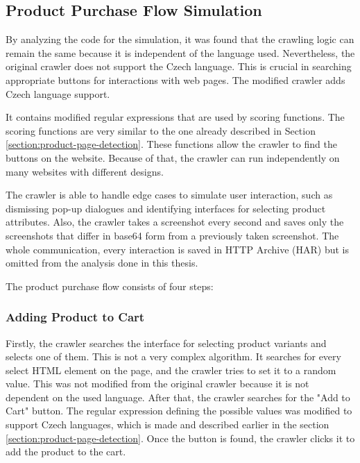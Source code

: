         \subsection{Product Purchase Flow Simulation}
        \label{section:flow-simulation}
            By analyzing the code for the simulation, it was found that the crawling logic can remain the same because it is independent of the language used. Nevertheless, the original crawler does not support the Czech language. This is crucial in searching appropriate buttons for interactions with web pages. The modified crawler adds Czech language support.

            It contains modified regular expressions that are used by scoring functions. The scoring functions are very similar to the one already described in Section \ref{section:product-page-detection}. These functions allow the crawler to find the buttons on the website. Because of that, the crawler can run independently on many websites with different designs. 

            The crawler is able to handle edge cases to simulate user interaction, such as dismissing pop-up dialogues and identifying interfaces for selecting product attributes. Also, the crawler takes a screenshot every second and saves only the screenshots that differ in base64 form \cite{base64} from a previously taken screenshot. The whole communication, every interaction is saved in HTTP Archive (HAR) but is omitted from the analysis done in this thesis.
            
            The product purchase flow consists of four steps:

        \subsubsection{Adding Product to Cart}
            Firstly, the crawler searches the interface for selecting product variants and selects one of them. This is not a very complex algorithm. It searches for every select HTML element on the page, and the crawler tries to set it to a random value. This was not modified from the original crawler because it is not dependent on the used language. After that, the crawler searches for the "Add to Cart" button. The regular expression defining the possible values was modified to support Czech languages, which is made and described earlier in the section \ref{section:product-page-detection}. Once the button is found, the crawler clicks it to add the product to the cart.

